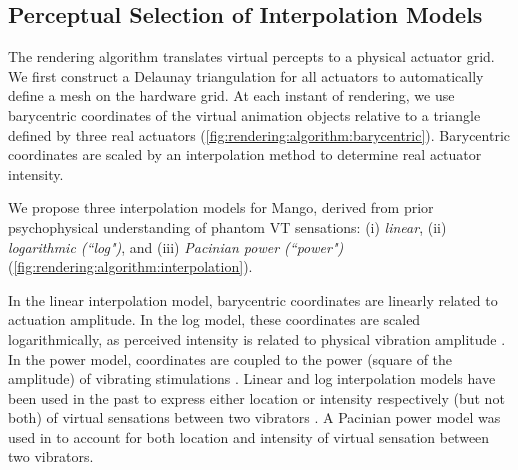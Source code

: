 \subsection{Perceptual Selection of Interpolation Models}
The rendering algorithm translates virtual percepts to a physical actuator grid.
We first construct a Delaunay triangulation for all actuators to automatically define a mesh on the hardware grid.
At each instant of rendering, we use barycentric coordinates of the virtual animation objects relative to a triangle defined by three real actuators (\autoref{fig:rendering:algorithm:barycentric}).
Barycentric coordinates are scaled by an interpolation method to determine real actuator intensity.

We propose three interpolation models for Mango, derived from prior psychophysical understanding of phantom VT sensations:
(i) {\it linear}, 
(ii) {\it logarithmic (``log")}, and 
(iii) {\it Pacinian power (``power")} (\autoref{fig:rendering:algorithm:interpolation}). 

In the linear interpolation model, barycentric coordinates are linearly related to actuation amplitude. In the log model, these coordinates are scaled logarithmically, as perceived intensity is related to physical vibration amplitude %
\cite{verrillo1992perception}. In the power model,  coordinates are coupled to the power (square of the amplitude) of vibrating stimulations \cite{verrillo1992perception}. 
Linear and log interpolation models have been used in the past to express either location or intensity respectively (but not both) of virtual sensations between two vibrators \cite{Seo2013,Alles1970}. A Pacinian power model was used in \cite{Israr2011a} to account for both location and intensity of virtual sensation between two vibrators.




